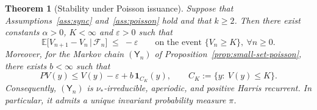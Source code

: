 \documentclass[a4paper,12pt,oneside,reqno]{amsart}
\newcommand{\E}{{\mathbb E}}
\newcommand{\F}{{\mathcal F}}
\newcommand{\1}{{\mathbf 1}}
\newtheorem{theo}{Theorem}[section]
\begin{document}
\begin{theo}[Stability under Poisson issuance]\label{theo:poisson-stability}
Suppose that Assumptions~\ref{ass:sync} and~\ref{ass:poisson} hold and that $k\ge2$. Then there exist constants $\alpha>0$, $K<\infty$ and $\varepsilon>0$ such that
\begin{equation}\label{eq:V-drift-poisson}
   \E\bigl[V_{n+1}-V_n \,\big\vert\, \F_n\bigr]
   \;\le\; -\varepsilon
   \qquad\text{on the event } \{V_n\ge K\},\ \forall n\ge 0.
\end{equation}
Moreover, for the Markov chain $(\mathsf{Y}_n)$ of Proposition~\ref{prop:small-set-poisson}, there exists $b<\infty$ such that
\[
   PV(y)\le V(y)-\varepsilon + b\,\mathbf 1_{C_K}(y),
   \qquad
   C_K:=\{y:\ V(y)\le K\}.
\]
Consequently, $(\mathsf{Y}_n)$ is $\nu_\ast$-irreducible, aperiodic, and positive Harris recurrent. In particular, it admits a unique invariant probability measure $\pi$.
\end{theo}
\end{document}
